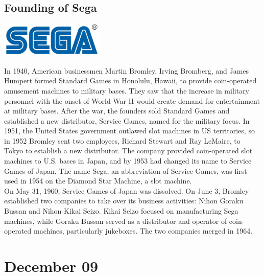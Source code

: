 \documentclass[11pt]{report}
\begin{document}
\subsection{Founding of Sega}
\vspace{2mm}\begin{center}\includegraphics[width=5cm]{./img/segaLogo.jpg}\end{center}
In 1940, American businessmen Martin Bromley, Irving Bromberg, and James Humpert formed Standard Games in Honolulu, Hawaii, to provide coin-operated amusement machines to military bases. They saw that the increase in military personnel with the onset of World War II would create demand for entertainment at military bases. After the war, the founders sold Standard Games and established a new distributor, Service Games, named for the military focus. In 1951, the United States government outlawed slot machines in US territories, so in 1952 Bromley sent two employees, Richard Stewart and Ray LeMaire, to Tokyo to establish a new distributor. The company provided coin-operated slot machines to U.S. bases in Japan, and by 1953 had changed its name to Service Games of Japan. The name Sega, an abbreviation of Service Games, was first used in 1954 on the Diamond Star Machine, a slot machine.\\
\indent On May 31, 1960, Service Games of Japan was dissolved. On June 3, Bromley established two companies to take over its business activities: Nihon Goraku Bussan and Nihon Kikai Seizo. Kikai Seizo focused on manufacturing Sega machines, while Goraku Bussan served as a distributor and operator of coin-operated machines, particularly jukeboxes. The two companies merged in 1964.
\section{December 09}
\end{document}
